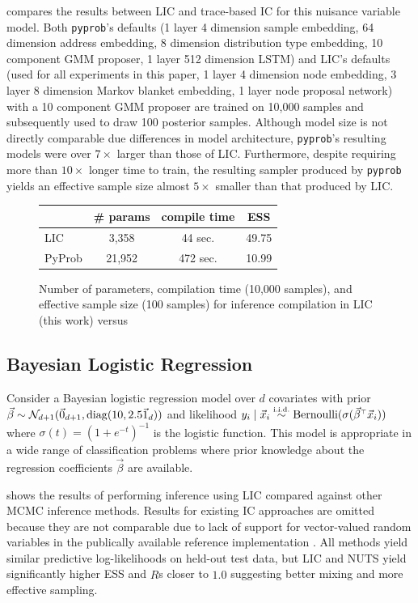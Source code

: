 \documentclass[thesis.tex]{subfiles}
\begin{document}
 compares the results between LIC and trace-based IC
\citep{le2017inference} for this nuisance variable model. Both \texttt{pyprob}'s
defaults (1 layer 4 dimension sample embedding, 64 dimension address
embedding, 8 dimension distribution type embedding, 10 component GMM
proposer, 1 layer 512 dimension LSTM) and LIC's defaults (used for all
experiments in this paper, 1 layer 4 dimension node embedding, 3 layer 8
dimension Markov blanket embedding, 1 layer node proposal network) with a 10
component GMM proposer are trained on 10,000 samples and subsequently used to
draw 100 posterior samples. Although model size is not directly comparable due
differences in model architecture, \texttt{pyprob}'s resulting models were over $7\times$
larger than those of LIC. Furthermore, despite requiring more than $10\times$ longer
time to train, the resulting sampler produced by \texttt{pyprob} yields
an effective sample size almost $5\times$ smaller than that produced by LIC.
\begin{figure}
  \centering
  \begin{tabular}{lccc}
    \toprule
           & \# params & compile time & ESS   \\
    \midrule
    LIC    & 3,358     & 44 sec.      & 49.75 \\
    PyProb & 21,952    & 472 sec.     & 10.99 \\
    \bottomrule
  \end{tabular}
  \caption{Number of parameters, compilation time (10,000 samples), and effective sample size (100 samples)
    for inference compilation in LIC (this work)
    versus \citep{pyprob2020}
  }\label{fig:nuisance}
\end{figure}

\subsection{Bayesian Logistic Regression}
\label{ssec:blr}

Consider a Bayesian logistic regression model over $d$ covariates
with prior
$\vec{\beta} \sim \mathcal{N}_{d+1}(\vec{0}_{d+1}, \operatorname*{\mathop{\mathrm{diag}}}(10, 2.5\vec{1}_{d}))$
and likelihood $y_i \mid \vx_i \simiid \text{Bernoulli}(\sigma(\vec{\beta}^\top \vx_i))$
where $\sigma(t) = (1 + e^{-t})^{-1}$ is the logistic function.
This model is appropriate in a wide range of classification problems where prior
knowledge about the regression coefficients $\vec{\beta}$ are available.

 shows the results of performing inference using LIC compared
against other MCMC inference methods. Results for existing IC approaches
\citep{le2017inference} are omitted because they are not comparable due to
lack of support for vector-valued random variables in the publically
available reference implementation \citep{pyprob2020}. All methods yield
similar predictive log-likelihoods on held-out test data, but LIC and NUTS
yield significantly higher ESS and $\widehat{R}$s closer to $1.0$ suggesting
better mixing and more effective sampling.
\end{document}
